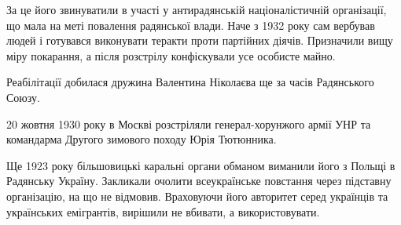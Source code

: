 За це його звинуватили в участі у антирадянській націоналістичній організації,
що мала на меті повалення радянської влади. Наче з 1932 року сам вербував людей
і готувався виконувати теракти проти партійних діячів. Призначили вищу міру
покарання, а після розстрілу конфіскували усе особисте майно.

Реабілітації добилася дружина Валентина Ніколаєва ще за часів Радянського
Союзу.

20 жовтня 1930 року в Москві розстріляли генерал-хорунжого армії УНР та
командарма Другого зимового походу Юрія Тютюнника.

Ще 1923 року більшовицькі каральні органи обманом виманили його з Польщі в
Радянську Україну. Закликали очолити всеукраїнське повстання через підставну
організацію, на що не відмовив. Враховуючи його авторитет серед українців та
українських емігрантів, вирішили не вбивати, а використовувати.

